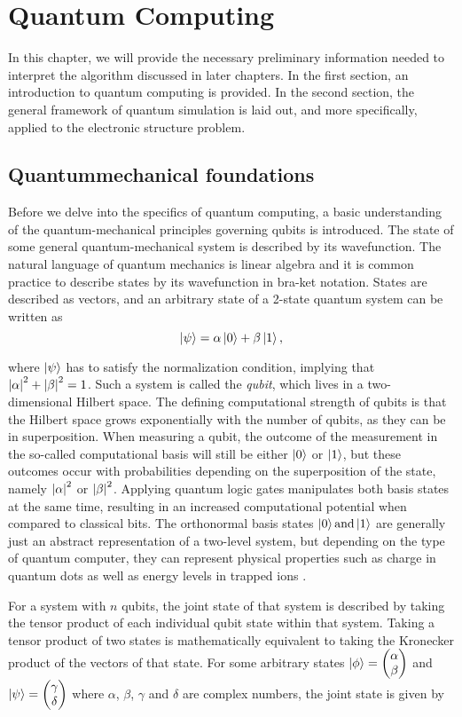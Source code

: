 \chapter{Quantum Computing}
\label{ch: qc}
In this chapter, we will provide the necessary preliminary information needed to interpret the algorithm discussed in later chapters.
In the first section, an introduction to quantum computing is provided. In the second section, the general framework of quantum simulation is laid out, and more specifically, applied to the electronic structure problem.
\section{Quantummechanical foundations}

Before we delve into the specifics of quantum computing, a basic understanding of the quantum-mechanical principles governing qubits is introduced. The state of some general quantum-mechanical system is described by its wavefunction. The natural language of quantum mechanics is linear algebra and it is common practice to describe states by its wavefunction in bra-ket notation. States are described as vectors, and an arbitrary state of a 2-state quantum system can be written as
$$\left\vert{\psi}\right\rangle = \alpha \left\vert{0}\right\rangle + \beta \left\vert{1}\right\rangle,$$

where $\left\vert{\psi}\right\rangle$ has to satisfy the normalization condition, implying that $\abs{\alpha}^2 + \abs{\beta}^2 = 1$. Such a system is called the \textit{qubit}, which lives in a two-dimensional Hilbert space. The defining computational strength of qubits is that the Hilbert space grows exponentially with the number of qubits, as they can be in superposition. When measuring a qubit, the outcome of the measurement in the so-called computational basis will still be either $\left\vert{0}\right\rangle$ or $ \left\vert{1}\right\rangle$, but these outcomes occur with probabilities depending on the superposition of the state, namely $\abs{\alpha}^2 $ or $ \abs{\beta}^2$. Applying quantum logic gates manipulates both basis states at the same time, resulting in an increased computational potential when compared to classical bits. The orthonormal basis states $\left\vert{0}\right\rangle \text{and} \left\vert{1}\right\rangle$ are generally just an abstract representation of a two-level system, but depending on the type of quantum computer, they can represent physical properties such as charge in quantum dots as well as energy levels in trapped ions \cite{McArdle}.

For a system with $n$ qubits, the joint state of that system is described by taking the tensor product of each individual qubit state within that system. Taking a tensor product of two states is mathematically equivalent to taking the Kronecker product of the vectors of that state. For some arbitrary states $\left\vert{\phi}\right\rangle = \begin{pmatrix} \alpha \\ \beta \end{pmatrix}$ and $\left\vert{\psi}\right\rangle = \begin{pmatrix} \gamma \\ \delta \end{pmatrix}$ where $\alpha$, $\beta$, $\gamma$ and $\delta$ are complex numbers, the joint state is given by

